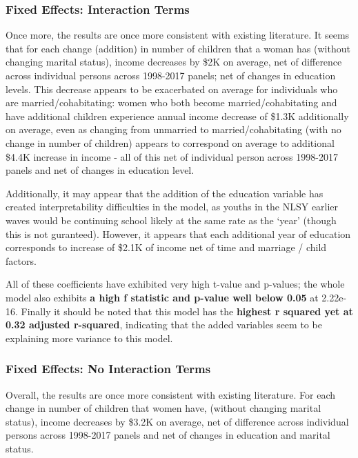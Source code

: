 \documentclass[
]{article}
\begin{document}
\hypertarget{fixed-effects-interaction-terms}{%
\subsubsection{Fixed Effects: Interaction
Terms}\label{fixed-effects-interaction-terms}}

Once more, the results are once more consistent with existing
literature. It seems that for each change (addition) in number of
children that a woman has (without changing marital status), income
decreases by \$2K on average, net of difference across individual
persons across 1998-2017 panels; net of changes in education levels.
This decrease appears to be exacerbated on average for individuals who
are married/cohabitating: women who both become married/cohabitating and
have additional children experience annual income decrease of \$1.3K
additionally on average, even as changing from unmarried to
married/cohabitating (with no change in number of children) appears to
correspond on average to additional \$4.4K increase in income - all of
this net of individual person across 1998-2017 panels and net of changes
in education level.

Additionally, it may appear that the addition of the education variable
has created interpretability difficulties in the model, as youths in the
NLSY earlier waves would be continuing school likely at the same rate as
the `year' (though this is not guranteed). However, it appears that each
additional year of education corresponds to increase of \$2.1K of income
net of time and marriage / child factors.

All of these coefficients have exhibited very high t-value and p-values;
the whole model also exhibits \textbf{a high f statistic and p-value
well below 0.05} at 2.22e-16. Finally it should be noted that this model
has the \textbf{highest r squared yet at 0.32 adjusted r-squared},
indicating that the added variables seem to be explaining more variance
to this model.

\hypertarget{fixed-effects-no-interaction-terms}{%
\subsubsection{Fixed Effects: No Interaction
Terms}\label{fixed-effects-no-interaction-terms}}

Overall, the results are once more consistent with existing literature.
For each change in number of children that women have, (without changing
marital status), income decreases by \$3.2K on average, net of
difference across individual persons across 1998-2017 panels and net of
changes in education and marital status.
\end{document}

